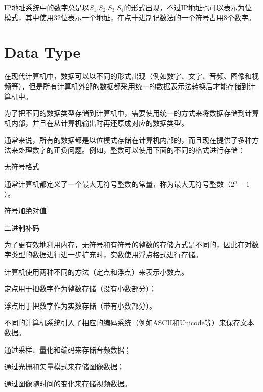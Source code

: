 IP地址系统中的数字总是以$S_1.S_2.S_3.S_4$的形式出现，不过IP地址也可以表示为位模式，其中使用32位表示一个地址，在点十进制记数法的一个符号占用8个数字。

\section{Data Type}

在现代计算机中，数据可以以不同的形式出现（例如数字、文字、音频、图像和视频等），但是所有计算机外部的数据都采用统一的数据表示法转换后才能存储到计算机中。

为了把不同的数据类型存储到计算机中，需要使用统一的方式来将数据存储到计算机内部，并且在从计算机输出时再还原成对应的数据类型。

通常来说，所有的数据都是以位模式存储在计算机内部的，而且现在提供了多种方法来处理数字的正负问题。例如，整数可以使用下面的不同的格式进行存储：

\begin{compactitem}
\item 无符号格式

通常计算机都定义了一个最大无符号整数的常量，称为最大无符号整数（$2^n-1$）。

\item 符号加绝对值


\item 二进制补码
\end{compactitem}

为了更有效地利用内存，无符号和有符号的整数的存储方式是不同的，因此在对数字类型的数据进行进一步扩充时，实数使用浮点格式进行存储。

计算机使用两种不同的方法（定点和浮点）来表示小数点。

\begin{compactitem}
\item 定点用于把数字作为整数存储（没有小数部分）；
\item 浮点用于把数字作为实数存储（带有小数部分）。
\end{compactitem}



不同的计算机系统引入了相应的编码系统（例如ASCII和Unicode等）来保存文本数据。

\begin{compactitem}
\item 通过采样、量化和编码来存储音频数据；
\item 通过光栅和矢量模式来存储图像数据；
\item 通过图像随时间的变化来存储视频数据。
\end{compactitem}


